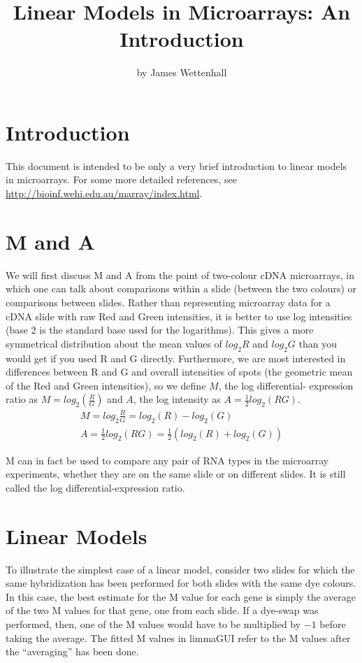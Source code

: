 \documentclass[a4paper,english,12pt]{article}
\begin{document}
\title{Linear Models in Microarrays: An Introduction}
\author{by James Wettenhall}
\maketitle
\section{Introduction}
This document is intended to be only a very brief introduction to linear models in microarrays.  For some more detailed
references, see \\
\url{http://bioinf.wehi.edu.au/marray/index.html}.

\section{M and A}
We will first discuss M and A from the point of two-colour cDNA microarrays, in which one can talk about comparisons
within a slide (between the two colours) or comparisons between slides.  Rather than representing microarray data for
a cDNA slide with raw Red and Green intensities, it is better to use log intensities (base 2 is the standard base used
for the logarithms).  This gives a more symmetrical distribution about the mean values of $log_{2}R$ and $log_{2}G$ than 
you would get if you used R and G directly.  Furthermore, we are most interested in differences between R and G and
overall intensities of spots (the geometric mean of the Red and Green intensities), so we define $M$, the log differential- 
expression ratio as $M=log_2(\frac{R}{G})$ and $A$, the log intensity as $A=\frac{1}{2} log_2(RG)$. \\

\begin{eqnarray}
M=log_2{\frac{R}{G}} = log_2(R) - log_2(G) \\
A=\frac{1}{2} log_2(RG) = \frac{1}{2} (log_2(R) + log_2(G))
\end{eqnarray}

M can in fact be used to compare any pair of RNA types in the microarray experiments, whether they
are on the same slide or on different slides.  It is still called the log differential-expression
ratio.\\

\section{Linear Models}
To illustrate the simplest case of a linear model, consider two slides for which the same hybridization has been
performed for both slides with the same dye colours.  In this case, the best estimate for the M value for each
gene is simply the average of the two M values for that gene, one from each slide.  If a dye-swap was performed,
then, one of the M values would have to be multiplied by $-1$ before taking the average.  The fitted M values
in limmaGUI refer to the M values after the ``averaging'' has been done.\\
\end{document}
